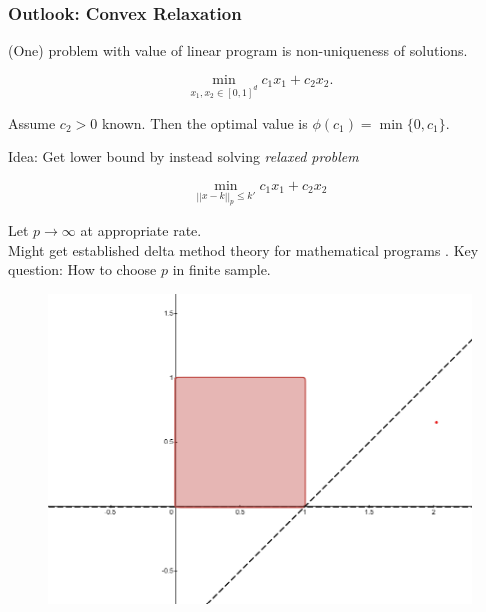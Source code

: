 \documentclass[11pt, aspectratio=169]{beamer}
\begin{document}
\begin{frame}
    \frametitle{Outlook: Convex Relaxation}

    (One) problem with value of linear program is non-uniqueness of solutions.

    \begin{equation*}
        \min_{x_1, x_2\in[0,1]^d} c_1 x_1 + c_2 x_2.
    \end{equation*}

    \vspace{0.5cm}
    Assume $c_2 > 0$ known. Then the optimal value is $\phi(c_1) = \min\{0, c_1\}$.

    \vspace{0.5cm}
    Idea: Get lower bound by instead solving \textit{relaxed problem}

    \begin{equation*}
        \min_{||x-k||_p\leq k'} c_1x_1 + c_2x_2
    \end{equation*}

    Let $p\to\infty$ at appropriate rate.\\
    Might get established delta method theory for mathematical programs \citep{shapiro1991asymptotic}.
    Key question: How to choose $p$ in finite sample.


\end{frame}

\begin{frame}
    \begin{figure}
        \includegraphics[height=0.9\textheight]{desmos_only_box.png}
    \end{figure}
\end{frame}
\end{document}
